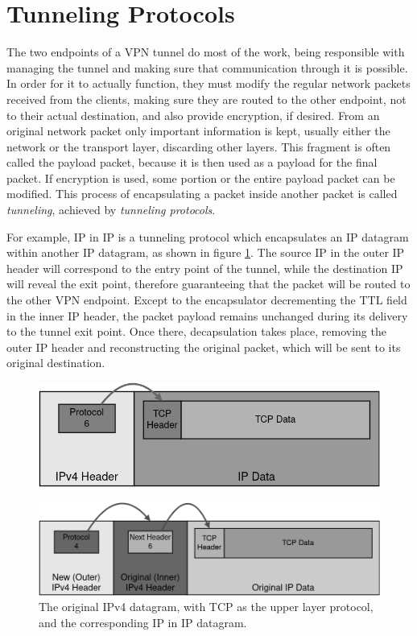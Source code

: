 \documentclass[a4paper,12pt]{report}
\begin{document}
		\section{Tunneling Protocols}
		The two endpoints of a VPN tunnel do most of the work, being responsible with managing the tunnel and making sure that communication through it is possible. In order for it to actually function, they must modify the regular network packets received from the clients, making sure they are routed to the other endpoint, not to their actual destination, and also provide encryption, if desired. From an original network packet only important information is kept, usually either the network or the transport layer, discarding other layers. This fragment is often called the payload packet, because it is then used as a payload for the final packet. If encryption is used, some portion or the entire payload packet can be modified. This process of encapsulating a packet inside another packet is called \textit{tunneling}, achieved by \textit{tunneling protocols}.
		
		For example, IP in IP is a tunneling protocol which encapsulates an IP datagram within another IP datagram, as shown in figure \ref{fig:ip-in-ip_packet}. The source IP in the outer IP header will correspond to the entry point of the tunnel, while the destination IP will reveal the exit point, therefore guaranteeing that the packet will be routed to the other VPN endpoint. Except to the encapsulator decrementing the TTL field in the inner IP header, the packet payload remains unchanged during its delivery to the tunnel exit point. Once there, decapsulation takes place, removing the outer IP header and reconstructing the original packet, which will be sent to its original destination.
		\begin{figure}[h]
			\includegraphics[width=\textwidth,height=0.14\textheight,keepaspectratio]{original_ipv4_packet}
			\centering
		\end{figure}
		\begin{figure}[h]
			\includegraphics[width=\textwidth]{ip_in_ip}
			\centering
			\caption{The original IPv4 datagram, with TCP as the upper layer protocol, and the corresponding IP in IP datagram.}
			\label{fig:ip-in-ip_packet}
		\end{figure}
		
\end{document}
